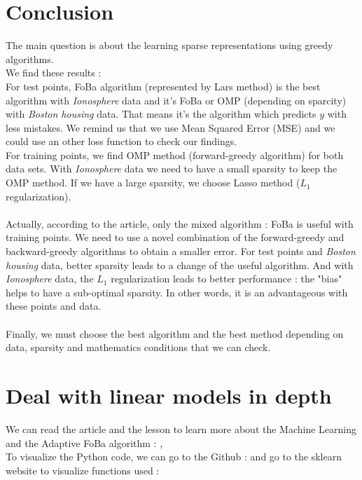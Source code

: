 \documentclass{article}
\begin{document}
\section*{Conclusion}
The main question is about the learning sparse representations using greedy algorithms.\\
We find these results :\\
For test points, FoBa algorithm (represented by Lars method) is the best algorithm with \textit{Ionosphere} data and it's FoBa or OMP (depending on sparcity) with \textit{Boston housing} data. That means it's the algorithm which predicts $y$ with less mistakes. We remind us that we use Mean Squared Error (MSE) and we could use an other loss function to check our findings.\\
For training points, we find OMP method (forward-greedy algorithm) for both data sets. With \textit{Ionosphere} data we need to have a small sparsity to keep the OMP method. If we have a large sparsity, we choose Lasso method ($L_1$ regularization).\\
\\
Actually, according to the article, only the mixed algorithm : FoBa is useful with training points. We need to use a novel combination of the forward-greedy and backward-greedy algorithms to obtain a smaller error. For test points and \textit{Boston housing} data, better sparsity leads to a change of the useful algorithm. And with \textit{Ionosphere} data, the $L_1$ regularization leads to better performance : the "bias" helps to have a sub-optimal sparsity. In other words, it is an advantageous with these points and data. \\
\\
Finally, we must choose the best algorithm and the best method depending on data, sparsity and mathematics conditions that we can check.



\section{Deal with linear models in depth}
\label{sec:pour_aller_plus_loin_sur_ce_theme}

We can read the article and the lesson to learn more about the Machine Learning and the Adaptive FoBa algorithm :
\cite{Article}, \cite{Teaching}\\
To visualize the Python code, we can go to the Github :
\cite{code} and go to the sklearn website to visualize functions used : \cite{algo} 

\newpage


\end{document}
